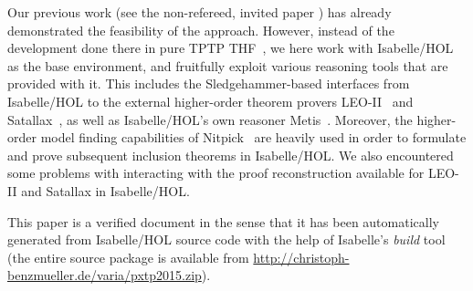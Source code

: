 \begin{isabellebody}
\begin{isamarkuptext}
Our previous work (see the non-refereed, invited paper \cite{B12}) has
already demonstrated the feasibility of the approach. However, instead
of the development done there in pure TPTP THF~\cite{C25},
we here work with Isabelle/HOL~\cite{Nipkow-Paulson-Wenzel:2002} as the base
environment, and fruitfully exploit various reasoning
tools that are provided with it. This includes the
Sledgehammer-based \cite{EasyChair:128} interfaces from Isabelle/HOL to
the external higher-order theorem provers LEO-II~\cite{C26} and
Satallax~\cite{Satallax}, as well as Isabelle/HOL's own reasoner
Metis~\cite{hurd2003d}. Moreover, the higher-order model finding capabilities
of Nitpick~\cite{BlanchetteN-ITP10} are heavily used in order to formulate
and prove subsequent inclusion theorems in Isabelle/HOL.
We also encountered some problems with interacting with the proof
reconstruction available for LEO-II and Satallax in Isabelle/HOL.

This paper is a verified document in
the sense that it has been automatically generated from Isabelle/HOL
source code with the help of Isabelle's \textit{build} tool (the
entire source package is available from
\url{http://christoph-benzmueller.de/varia/pxtp2015.zip}).


\end{isamarkuptext}
\end{isabellebody}
